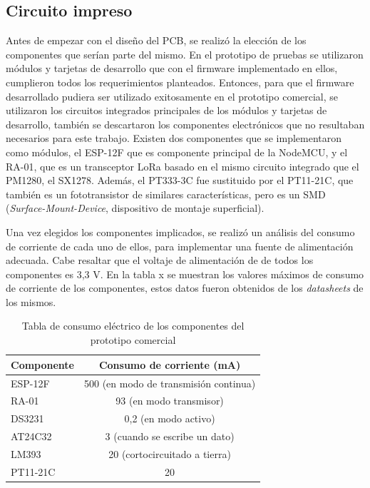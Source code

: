 
\subsection{Circuito impreso}

Antes de empezar con el diseño del PCB, se realizó la elección de los componentes que serían parte del mismo. En el prototipo de pruebas se utilizaron módulos y tarjetas de desarrollo que con el firmware implementado en ellos, cumplieron todos los requerimientos planteados. Entonces, para que el firmware desarrollado pudiera ser utilizado exitosamente en el prototipo comercial, se utilizaron los circuitos integrados principales de los módulos y tarjetas de desarrollo, también se descartaron los componentes electrónicos que no resultaban necesarios para este trabajo. Existen dos componentes que se implementaron como módulos, el ESP-12F que es componente principal de la NodeMCU, y el RA-01, que es un transceptor LoRa basado en el mismo circuito integrado que el PM1280, el SX1278. Además, el PT333-3C fue sustituido por el PT11-21C, que también es un fototransistor de similares características, pero es un SMD (\textit{Surface-Mount-Device}, dispositivo de montaje superficial).

Una vez elegidos los componentes implicados, se realizó un análisis del consumo de corriente de cada uno de ellos, para implementar una fuente de alimentación adecuada. Cabe resaltar que el voltaje de alimentación de de todos los componentes es 3,3 V. En la tabla x se muestran los valores máximos de consumo de corriente de los componentes, estos datos fueron obtenidos de los \textit{datasheets} de los mismos.

\begin{table}[h]
	\centering
	\caption[Consumo del prototipo comercial]{Tabla de consumo eléctrico de los componentes del prototipo comercial}
	\begin{tabular}{l c}    
		\toprule
		\textbf{Componente} & \textbf{Consumo de corriente (mA)} \\
		\midrule
		ESP-12F 	& 500 (en modo de transmisión continua) \\		
		RA-01		& 93 (en modo transmisor)\\
		DS3231		& 0,2 (en modo activo) \\
		AT24C32 	& 3 (cuando se escribe un dato)\\
		LM393 		& 20 (cortocircuitado a tierra) \\
		PT11-21C	& 20 \\
		\bottomrule
		\hline
	\end{tabular}
	\label{tab:componentsPower}
\end{table}

